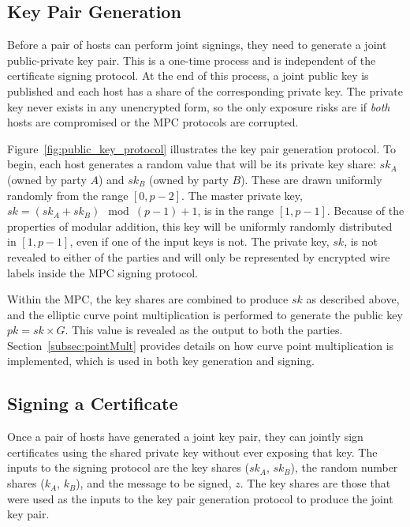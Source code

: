 
\subsection{Key Pair Generation}\label{sec:keygeneration}

Before a pair of hosts can perform joint signings, they need to generate a joint public-private key pair. This is a one-time process and is independent of the certificate signing protocol. At the end of this process, a joint public key is published and each host has a share of the corresponding private key. The private key never exists in any unencrypted form, so the only exposure risks are if \emph{both} hosts are compromised or the MPC protocols are corrupted.

Figure~\ref{fig:public_key_protocol} illustrates the key pair generation protocol. To begin, each host generates a random value that will be its private key share: $sk_A$ (owned by party $A$) and $sk_B$ (owned by party $B$). These are drawn uniformly randomly from the range $[0, p-2]$.  The master private key, $sk = (sk_A + sk_B) \mod (p - 1) + 1$, is in the range $[1, p-1]$. Because of the properties of modular addition, this key will be uniformly randomly distributed in $[1, p-1]$, even if one of the input keys is not.  The private key, $sk$, is not revealed to either of the parties and will only be represented by encrypted wire labels inside the MPC signing protocol.  

Within the MPC, the key shares are combined to produce $sk$ as described above, and the elliptic curve point multiplication is performed to generate the public key $pk = sk \times G$. This value is revealed as the output to both the parties. Section~\ref{subsec:pointMult} provides details on how curve point multiplication is implemented, which is used in both key generation and signing.


\subsection{Signing a Certificate}\label{sec:signing}

Once a pair of hosts have generated a joint key pair, they can jointly sign certificates using the shared private key without ever exposing that key.
The inputs to the signing protocol are the key shares ($sk_A$, $sk_B$), the random number shares ($k_A$, $k_B$), and the message to be signed, $z$. The key shares are those that were used as the inputs to the key pair generation protocol to produce the joint key pair.

